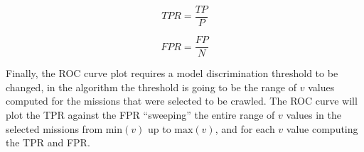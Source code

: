 \begin{equation} \label{eq:tpr}
    TPR = \dfrac{TP}{P}
\end{equation}

\begin{equation} \label{eq:fpr}
    FPR = \dfrac{FP}{N}
\end{equation}

Finally, the ROC curve plot requires a model discrimination threshold to be changed, in the \mlblink algorithm the threshold is going to be the range of $v$ values computed for the missions that were selected to be crawled. The ROC curve will plot the TPR against the FPR ``sweeping'' the entire range of $v$ values in the selected missions from $\text{min}(v)$ up to $\text{max}(v)$, and for each $v$ value computing the TPR and FPR.
